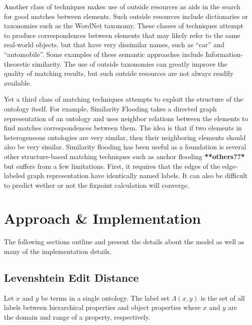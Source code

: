 \documentclass[letterpaper,twocolumn,12pt]{article}
\begin{document}
Another class of techniques makes use of outside resources as aids in the search for
good matches between elements. Such outside resources include dictionaries or taxonomies
such as the WordNet taxonomy. These classes of techniques attempt to produce correspondences
between elements that may likely refer to the same real-world objects, but that have very
dissimilar names, such as ``car'' and ``automobile''. Some examples of these semantic 
approaches include Information-theoretic similarity.
%
The use of outside taxonomies can greatly improve the quality of matching results,
but such outside resources are not always readily available.

Yet a third class of matching techniques attempts to exploit the structure of the ontology
itself. For example, Similarity Flooding takes a directed graph representation of an 
ontology and uses neighbor relations between the elements to find matches correspondences
between them. The idea is that if two elements in heterogeneous ontologies are very similar,
then their neighboring elements should also be very similar.
%
Similarity flooding has been useful as a foundation is several other structure-based
matching techniques such as anchor flooding \textbf{**others??*} but suffers from 
a few limitations. First, it requires that the edges of the edge-labeled graph 
representation have identically named labels. It can also be difficult to predict
wether or not the fixpoint calculation will converge.
\newline

\section{Approach \& Implementation}
\label{sec:approach}

The following sections outline and present the details about the model as well as many of the implementation details.

\subsection{Levenshtein Edit Distance}

\begin{defn}
Let $x$ and $y$ be terms in a single ontology. The label set $\Lambda \left( x, y \right)$ is the set of all labels between hierarchical properties and object properties where $x$ and $y$ are the domain and range of a property, respectively.
\end{defn}
\end{document}
